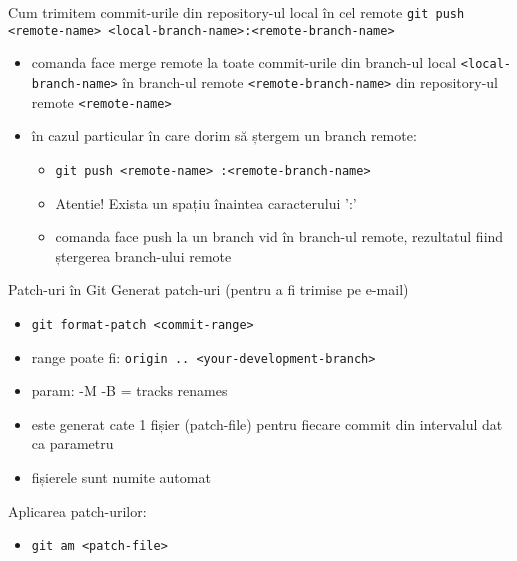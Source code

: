\documentclass{beamer}
\begin{document}
\begin{frame}{Cum trimitem commit-urile din repository-ul local în cel remote}
\texttt{git push <remote-name> <local-branch-name>:<remote-branch-name>}
\begin{itemize} %
\item comanda face merge remote la toate commit-urile din branch-ul local \texttt{<local-branch-name>} în branch-ul remote \texttt{<remote-branch-name>} din repository-ul remote \texttt{<remote-name>}
\pause \item în cazul particular în care dorim să ștergem un branch remote:
\begin{itemize} %
	\item \texttt{git push <remote-name> :<remote-branch-name>}
	\item Atentie! Exista un spațiu înaintea caracterului ':'
	\item comanda face push la un branch vid în branch-ul remote, rezultatul fiind ștergerea branch-ului remote
\end{itemize}
\end{itemize}
\end{frame}

\begin{frame}{Patch-uri în Git}
Generat patch-uri (pentru a fi trimise pe e-mail)
\begin{itemize} %
\item \texttt{git format-patch <commit-range> }
\item range poate fi: \texttt{origin .. <your-development-branch>}
\item param: -M -B = tracks renames
\item este generat cate 1 fișier (patch-file) pentru fiecare commit din intervalul dat ca parametru
\item fișierele sunt numite automat
\end{itemize}
\pause Aplicarea patch-urilor:
\begin{itemize} %
\item \texttt{git am <patch-file>}
\end{itemize}
\end{frame}
\end{document}
